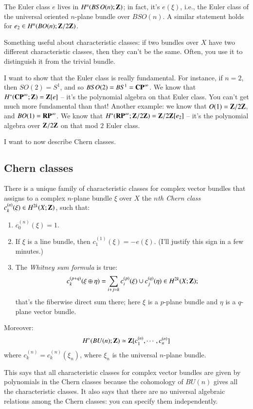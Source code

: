 The Euler class $e$ lives in $H^n(BSO(n);\mathbf Z)$; in fact, it's $e(\xi)$, i.e., the Euler class of the universal oriented $n$-plane bundle over $BSO(n)$. A similar statement holds for $e_2\in H^n(BO(n);\mathbf Z/2\mathbf Z)$.

Something useful about characteristic classes:
if two bundles over $X$ have two different characteristic classes, then they can't be the same.
Often, you use it to distinguish it from the trivial bundle.

I want to show that the Euler class is really fundamental.
For instance, if $n=2$, then $SO(2) = S^1$, and so $BSO(2) = BS^1 = \mathbf{CP}^\infty$.
We know that $H^\ast(\mathbf{CP}^\infty;\mathbf Z) = \mathbf Z[e]$ -- it's the polynomial algebra on that Euler class.
You can't get much more fundamental than that!
Another example: we know that $O(1) = \mathbf Z/2\mathbf Z$, and $BO(1) = \mathbf{RP}^\infty$.
We know that $H^\ast(\mathbf{RP}^\infty;\mathbf Z/2\mathbf Z) = \mathbf Z/2\mathbf Z[e_2]$ -- it's the polynomial algebra over $\mathbf Z/2\mathbf Z$ on that mod $2$ Euler class.

I want to now describe Chern classes.
\subsection{Chern classes}
\begin{theorem}
    There is a unique family of characteristic classes for complex vector bundles that assigns to a complex $n$-plane bundle $\xi$ over $X$ the \emph{$n$th Chern class} $c^{(n)}_k(\xi)\in H^{2k}(X;\mathbf Z)$, such that:
    \begin{enumerate}
	\item $c^{(n)}_0(\xi) = 1$.
	\item If $\xi$ is a line bundle, then $c^{(1)}_1(\xi) = -e(\xi)$. (I'll justify this sign in a few minutes.)
	\item The \emph{Whitney sum formula} is true:
	    \begin{equation*}
		c^{(p+q)}_k(\xi\oplus \eta) = \sum_{i+j=k} c^{(p)}_i(\xi)\cup c^{(q)}_j(\eta) \in H^{2k}(X;\mathbf Z);
	    \end{equation*}
	    that's the fiberwise direct sum there; here $\xi$ is a $p$-plane bundle and $\eta$ is a $q$-plane vector bundle.
    \end{enumerate}
    Moreover:
    $$H^\ast(BU(n);\mathbf Z) \simeq \mathbf Z[c_1^{(n)}, \cdots, c^{(n)}_n]$$
    where $c^{(n)}_k = c^{(n)}_k(\xi_n)$, where $\xi_n$ is the universal $n$-plane bundle.
\end{theorem}
This says that all characteristic classes for complex vector bundles are given by polynomials in the Chern classes
because the cohomology of $BU(n)$ gives all the characteristic classes.
It also says that there are no universal algebraic relations among the Chern classes: you can specify them independently.

